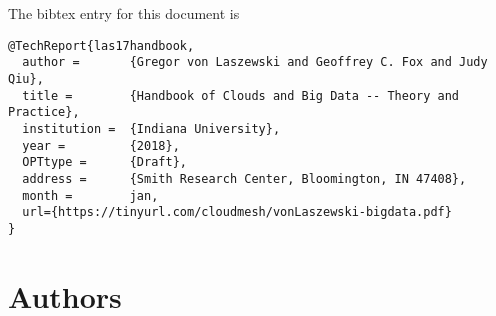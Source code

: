 The bibtex entry for this document is

\begin{verbatim}
@TechReport{las17handbook,
  author =       {Gregor von Laszewski and Geoffrey C. Fox and Judy Qiu},
  title =        {Handbook of Clouds and Big Data -- Theory and Practice},
  institution =  {Indiana University},
  year =         {2018},
  OPTtype =      {Draft},
  address =      {Smith Research Center, Bloomington, IN 47408},
  month =        jan,
  url={https://tinyurl.com/cloudmesh/vonLaszewski-bigdata.pdf} 
}
\end{verbatim}



\section{Authors}

\FILENAME

